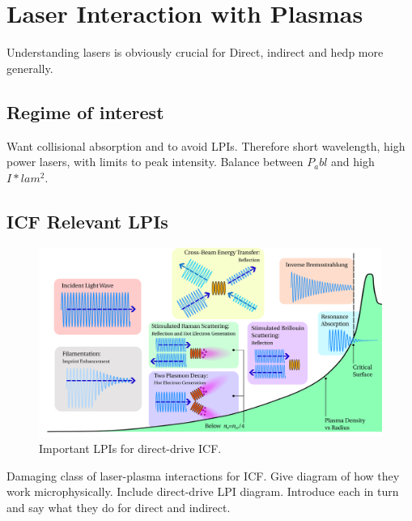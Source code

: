 \section{Laser Interaction with Plasmas}%
\label{sec:intro_laserplasmas}

Understanding lasers is obviously crucial for Direct, indirect and hedp more generally.

\subsection{Regime of interest}%
\label{sec:intro_laser_regime}

Want collisional absorption and to avoid LPIs.
Therefore short wavelength, high power lasers, with limits to peak intensity.
Balance between $P_abl$ and high $I*lam^2$.

\subsection{ICF Relevant LPIs}%
\label{sec:intro_LPIs}

\begin{figure}[t!]
    \includegraphics[width=\linewidth]{Introduction/Images/LPI diagram.png}
    \centering
    \caption{Important \ac{LPIs} for direct-drive \ac{ICF}.
    }%
    \label{fig:intro_dd_lpis}
\end{figure}

Damaging class of laser-plasma interactions for ICF.
Give diagram of how they work microphysically.
Include direct-drive LPI diagram.
Introduce each in turn and say what they do for direct and indirect.

